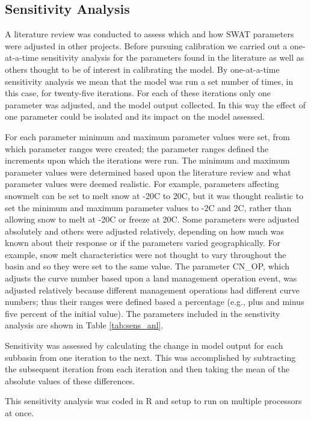 \subsection{Sensitivity Analysis}
	A literature review was conducted to assess which and how SWAT parameters were adjusted in other projects. Before pursuing calibration we carried out a one-at-a-time sensitivity analysis for the parameters found in the literature as well as others thought to be of interest in calibrating the model. By one-at-a-time sensitivity analysis we mean that the model was run a set number of times, in this case, for twenty-five iterations. For each of these iterations only one parameter was adjusted, and the model output collected. In this way the effect of one parameter could be isolated and its impact on the model assessed. 

	For each parameter minimum and maximum parameter values were set, from which parameter ranges were created; the parameter ranges defined the increments upon which the iterations were run. The minimum and maximum parameter values were determined based upon the literature review and what parameter values were deemed realistic. For example, parameters affecting snowmelt can be set to melt snow at -20\degree C  to 20\degree C, but it was thought realistic to set the minimum and maximum parameter values to -2\degree C  and 2\degree C, rather than allowing snow to melt at -20\degree C  or freeze at 20\degree C. Some parameters were adjusted absolutely and others were adjusted relatively, depending on how much was known about their response or if the parameters varied geographically. For example, snow melt characteristics were not thought to vary throughout the basin and so they were set to the same value. The parameter CN\_OP, which adjusts the curve number based upon a land management operation event, was adjusted relatively because different management operations had different curve numbers; thus their ranges were defined based a percentage (e.g., plus and minus five percent of the initial value). The parameters included in the senstivity analysis are shown in Table \ref{tab:sens_anl}.

	Sensitivity was assessed by calculating the change in model output for each subbasin from one iteration to the next. This was accomplished by subtracting the subsequent iteration from each iteration and then taking the mean of the absolute values of these differences.

	This sensitivity analysis was coded in R and setup to run on multiple processors at once.

\pagebreak